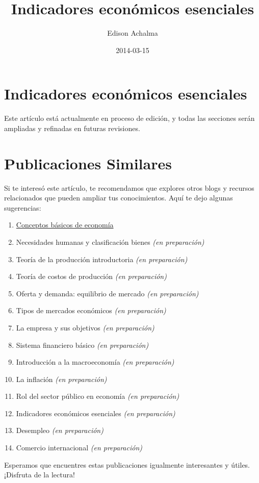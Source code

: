\documentclass[
  jou,
  floatsintext,
  longtable,
  a4paper,
  nolmodern,
  notxfonts,
  notimes,
  12pt,
  colorlinks=true,linkcolor=blue,citecolor=blue,urlcolor=blue]{apa7}
\title{Indicadores económicos esenciales}
\author{Edison Achalma}
\affiliation{
{Escuela Profesional de Economía, Universidad Nacional de San Cristóbal
de Huamanga}}
\date{2014-03-15}
\providecommand{\tightlist}{%
  \setlength{\itemsep}{0pt}\setlength{\parskip}{0pt}}
\begin{document}
\maketitle


\hypertarget{toc}{}
\tableofcontents
\newpage
\section[Introduction]{Indicadores económicos esenciales}

\setcounter{secnumdepth}{3}

\setlength\LTleft{0pt}




Este artículo está actualmente en proceso de edición, y todas las
secciones serán ampliadas y refinadas en futuras revisiones.

\section{Publicaciones Similares}\label{publicaciones-similares}

Si te interesó este artículo, te recomendamos que explores otros blogs y
recursos relacionados que pueden ampliar tus conocimientos. Aquí te dejo
algunas sugerencias:

\begin{enumerate}
\def\labelenumi{\arabic{enumi}.}
\tightlist
\item
  \href{https://achalmaedison.netlify.app/cursos/pre_economia/2014-i/sesiones/01-conceptos-basicos-de-economia/index.pdf}{}
  \href{https://achalmaedison.netlify.app/cursos/pre_economia/2014-i/sesiones/01-conceptos-basicos-de-economia}{Conceptos
  básicos de economía}
\item
  Necesidades humanas y clasificación bienes \emph{(en preparación)}
\item
  Teoría de la producción introductoria \emph{(en preparación)}
\item
  Teoría de costos de producción \emph{(en preparación)}
\item
  Oferta y demanda: equilibrio de mercado \emph{(en preparación)}
\item
  Tipos de mercados económicos \emph{(en preparación)}
\item
  La empresa y sus objetivos \emph{(en preparación)}
\item
  Sistema financiero básico \emph{(en preparación)}
\item
  Introducción a la macroeconomía \emph{(en preparación)}
\item
  La inflación \emph{(en preparación)}
\item
  Rol del sector público en economía \emph{(en preparación)}
\item
  Indicadores económicos esenciales \emph{(en preparación)}
\item
  Desempleo \emph{(en preparación)}
\item
  Comercio internacional \emph{(en preparación)}
\end{enumerate}

Esperamos que encuentres estas publicaciones igualmente interesantes y
útiles. ¡Disfruta de la lectura!
\end{document}
